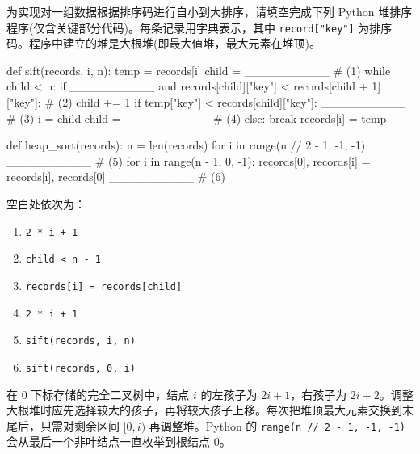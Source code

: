 \begin{question}[堆排序]
为实现对一组数据根据排序码进行自小到大排序，请填空完成下列 Python 堆排序程序(仅含关键部分代码)。每条记录用字典表示，其中 \texttt{record["key"]} 为排序码。程序中建立的堆是大根堆(即最大值堆，最大元素在堆顶)。
\begin{pycode}
def sift(records, i, n):
    temp = records[i]
    child = __________                         # (1)
    while child < n:
        if __________ and records[child]["key"] < records[child + 1]["key"]: # (2)
            child += 1
        if temp["key"] < records[child]["key"]:
            __________                         # (3)
            i = child
            child = __________                 # (4)
        else:
            break
    records[i] = temp


def heap_sort(records):
    n = len(records)
    for i in range(n // 2 - 1, -1, -1):
        __________                             # (5)
    for i in range(n - 1, 0, -1):
        records[0], records[i] = records[i], records[0]
        __________                             # (6)
\end{pycode}
\begin{solution}
空白处依次为：
\begin{enumerate}
  \item \texttt{2 * i + 1}
  \item \texttt{child < n - 1}
  \item \texttt{records[i] = records[child]}
  \item \texttt{2 * i + 1}
  \item \texttt{sift(records, i, n)}
  \item \texttt{sift(records, 0, i)}
\end{enumerate}
在 $0$ 下标存储的完全二叉树中，结点 $i$ 的左孩子为 $2i+1$，右孩子为 $2i+2$。调整大根堆时应先选择较大的孩子，再将较大孩子上移。每次把堆顶最大元素交换到末尾后，只需对剩余区间 $[0,i)$ 再调整堆。Python 的 \texttt{range(n // 2 - 1, -1, -1)} 会从最后一个非叶结点一直枚举到根结点 $0$。
\end{solution}
\end{question}


